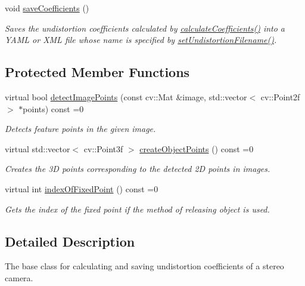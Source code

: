 \begin{DoxyCompactItemize}
\mbox{\label{classstereo__ugv_1_1LensCalibrator_a770bc3091deec850b75b72d11ee9bda7}} 
void \hyperlink{classstereo__ugv_1_1LensCalibrator_a770bc3091deec850b75b72d11ee9bda7}{save\+Coefficients} ()
\begin{DoxyCompactList}\small\item\em Saves the undistortion coefficients calculated by \hyperlink{classstereo__ugv_1_1LensCalibrator_aeeb532144b29ae7004ee14e2695def97}{calculate\+Coefficients()} into a Y\+A\+ML or X\+ML file whose name is specified by \hyperlink{classstereo__ugv_1_1LensCalibrator_a4debdb4b31e7b474576269cc15da15d7}{set\+Undistortion\+Filename()}. \end{DoxyCompactList}\end{DoxyCompactItemize}
\subsection*{Protected Member Functions}
\begin{DoxyCompactItemize}
\item 
virtual bool \hyperlink{classstereo__ugv_1_1LensCalibrator_a9be834b0ef2983af47ac5f9dd67887fe}{detect\+Image\+Points} (const cv\+::\+Mat \&image, std\+::vector$<$ cv\+::\+Point2f $>$ $\ast$points) const =0
\begin{DoxyCompactList}\small\item\em Detects feature points in the given image. \end{DoxyCompactList}\item 
virtual std\+::vector$<$ cv\+::\+Point3f $>$ \hyperlink{classstereo__ugv_1_1LensCalibrator_a3edf81dfc9567904a0d1a7c3555d65bf}{create\+Object\+Points} () const =0
\begin{DoxyCompactList}\small\item\em Creates the 3D points corresponding to the detected 2D points in images. \end{DoxyCompactList}\item 
virtual int \hyperlink{classstereo__ugv_1_1LensCalibrator_ad25267d7b60a912f270701359eda1c54}{index\+Of\+Fixed\+Point} () const =0
\begin{DoxyCompactList}\small\item\em Gets the index of the fixed point if the method of releasing object is used. \end{DoxyCompactList}\end{DoxyCompactItemize}


\subsection{Detailed Description}
The base class for calculating and saving undistortion coefficients of a stereo camera. 

